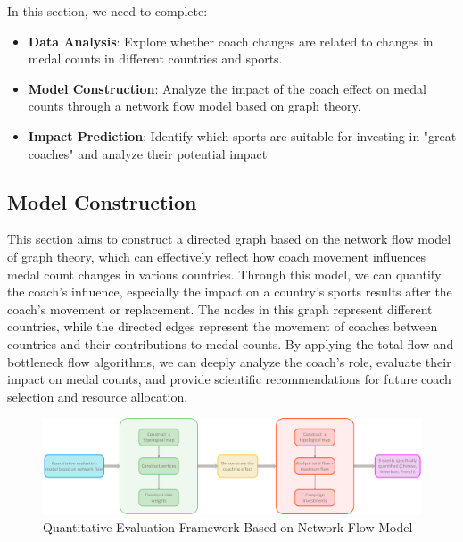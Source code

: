 \documentclass{mcmthesis}
\begin{document}
In this section, we need to complete:
\begin{itemize}
    \item 	{\bf Data Analysis}: Explore whether coach changes are related to changes in medal counts in different countries and sports.
    \item	{\bf Model Construction}: Analyze the impact of the coach effect on medal counts through a network flow model based on graph theory.
    \item	{\bf Impact Prediction}: Identify which sports are suitable for investing in "great coaches" and analyze their potential impact
\end{itemize}

\subsection{Model Construction}
This section aims to construct a directed graph based on the network flow model of graph theory, which can effectively reflect how coach movement influences medal count changes in various countries. Through this model, we can quantify the coach’s influence, especially the impact on a country’s sports results after the coach's movement or replacement. The nodes in this graph represent different countries, while the directed edges represent the movement of coaches between countries and their contributions to medal counts. By applying the total flow and bottleneck flow algorithms, we can deeply analyze the coach's role, evaluate their impact on medal counts, and provide scientific recommendations for future coach selection and resource allocation.
\begin{figure}[h]   
    \centering          
    \includegraphics[width=12cm]{graph/graphy_baseline.png}
    \caption{Quantitative Evaluation Framework Based on Network Flow Model } \label{fig1}    
\end{figure}


\end{document}
